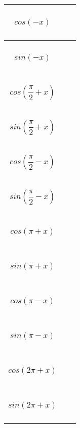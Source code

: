 \documentclass[11pt,landscape]{article}
\begin{document}
\begin{multicols}{4}
\begin{center}
    \begin{tabular}{| c | m{2cm} |}
      \hline
      $cos(-x) \phantom{\dfrac{\dfrac{x}{x}}{\dfrac{x}{x}}}$                 & \tabularnewline
      \hline
      $sin(-x) \phantom{\dfrac{\dfrac{x}{x}}{\dfrac{x}{x}}}$                 & \tabularnewline
      \hline\hline 
      $cos(\dfrac{\pi}{2} + x) \phantom{\dfrac{\dfrac{x}{x}}{\dfrac{x}{x}}}$ & \tabularnewline
      \hline  
      $sin(\dfrac{\pi}{2} + x) \phantom{\dfrac{\dfrac{x}{x}}{\dfrac{x}{x}}}$ & \tabularnewline
      \hline\hline
      $cos(\dfrac{\pi}{2} - x) \phantom{\dfrac{\dfrac{x}{x}}{\dfrac{x}{x}}}$ & \tabularnewline
      \hline
      $sin(\dfrac{\pi}{2} - x) \phantom{\dfrac{\dfrac{x}{x}}{\dfrac{x}{x}}}$ & \tabularnewline
      \hline\hline
      $cos(\pi + x) \phantom{\dfrac{\dfrac{x}{x}}{\dfrac{x}{x}}}$            & \tabularnewline
      \hline
      $sin(\pi + x) \phantom{\dfrac{\dfrac{x}{x}}{\dfrac{x}{x}}}$            & \tabularnewline
      \hline\hline
      $cos(\pi - x) \phantom{\dfrac{\dfrac{x}{x}}{\dfrac{x}{x}}}$            & \tabularnewline
      \hline
      $sin(\pi - x) \phantom{\dfrac{\dfrac{x}{x}}{\dfrac{x}{x}}}$            & \tabularnewline
      \hline\hline
      $cos(2 \pi + x) \phantom{\dfrac{\dfrac{x}{x}}{\dfrac{x}{x}}}$          & \tabularnewline
      \hline
      $sin(2 \pi + x) \phantom{\dfrac{\dfrac{x}{x}}{\dfrac{x}{x}}}$          & \tabularnewline
      \hline
    \end{tabular}
  \end{center}

\end{multicols}
\end{document}
